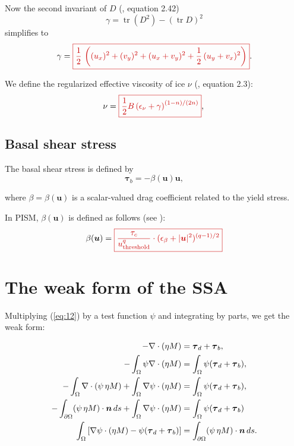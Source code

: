 \documentclass{amsart}
\DeclareMathOperator{\Tr}{tr}
\newcommand{\I}{\ensuremath{\int_{\Omega}}}
\newcommand{\bI}{\ensuremath{\int_{\partial \Omega}}}
\newcommand{\M}{\ensuremath{\eta M}}
\newcommand{\betaU}{\beta(\boldsymbol{u})}
\newcommand{\basalshearstress}[1]{\boldsymbol{\tau}_{b#1}}
\newcommand{\taub}{\basalshearstress{}}
\newcommand{\drivingstress}[1]{\boldsymbol{\tau}_{d#1}}
\newcommand{\taud}{\drivingstress{}}
\newcommand{\highlight}[1]{{\color{red!80!black} \fbox{$ \displaystyle #1 $} }}
\begin{document}
Now the second invariant of $D$ (\cite{GreveBlatter2009}, equation 2.42)
\begin{equation*}
  \gamma = \Tr (D^2) - \left( \Tr D \right)^2
\end{equation*}
simplifies to
\begin{equation}
  \label{eq:6}
  \gamma = \highlight{ \frac{1}{2}\, \left( (u_x)^2 + (v_y)^2 + (u_x + v_y)^2 + \frac{1}{2}\,(u_y + v_x)^2 \right) }.
\end{equation}

We define the regularized effective viscosity of ice $\nu$ (\cite{SchoofStream}, equation 2.3):
\begin{equation}
  \label{eq:7}
  \nu = \highlight{ \frac{1}{2} B \left( \epsilon_{\nu} + \gamma \right)^{(1 - n) / (2n)} },\\
\end{equation}

\subsection{Basal shear stress}
\label{sec:beta}

The basal shear stress is defined by
\begin{equation}
  \label{eq:9}
  \taub =  - \betaU \boldsymbol{u},
\end{equation}

where $\beta = \betaU$ is a scalar-valued drag coefficient related to the yield stress.

In PISM, $\betaU$ is defined as follows (see \cite{SchoofHindmarsh}):
\begin{equation}
  \label{eq:10}
  \betaU = \highlight{ \frac{\tau_c}{u_{\text{threshold}}^q}\cdot (\epsilon_{\beta} + |\boldsymbol{u}|^2)^{(q - 1) / 2} }
\end{equation}


\section{The weak form of the SSA}

Multiplying (\ref{eq:12}) by a test function $\psi$ and integrating by parts, we get the weak form:

\begin{align}
 - \nabla \cdot (\M) & = \taud + \taub,\notag \\
 - \I \psi \nabla \cdot (\M) & = \I \psi (\taud + \taub),\notag \\
 - \I \nabla \cdot (\psi\, \M) + \I \nabla \psi \cdot (\M) & = \I \psi (\taud + \taub),\notag \\
 - \bI (\psi\, \M)\cdot \boldsymbol{n}\, ds + \I \nabla \psi \cdot (\M) & = \I \psi (\taud + \taub)\notag \\
  \label{eq:11}
  \I \left[\nabla \psi \cdot (\M) - \psi (\taud + \taub)\right] & = \bI (\psi\, \M) \cdot \boldsymbol{n}\, ds.
\end{align}
\end{document}

